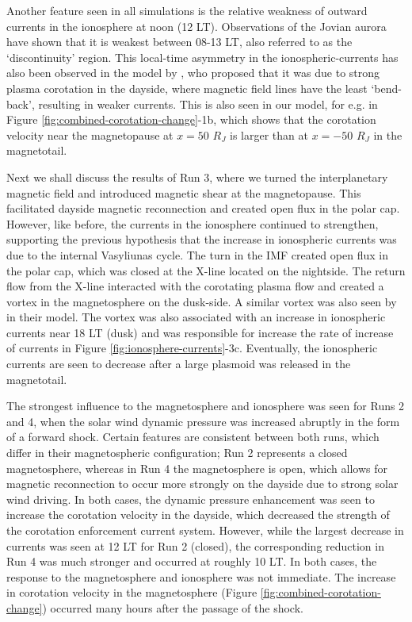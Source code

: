 Another feature seen in all simulations is the relative weakness of outward currents in the ionosphere at noon (12 LT). Observations of the Jovian aurora have shown that it is weakest between 08-13 LT, also referred to as the `discontinuity' region. This local-time asymmetry in the ionospheric-currents has also been observed in the model by , who proposed that it was due to strong plasma corotation in the dayside, where magnetic field lines have the least `bend-back', resulting in weaker currents. This is also seen in our model, for e.g. in Figure \ref{fig:combined-corotation-change}-1b, which shows that the corotation velocity near the magnetopause at $x=50$ $R_J$ is larger than at $x=-50$ $R_J$ in the magnetotail. 

Next we shall discuss the results of Run 3, where we turned the interplanetary magnetic field and introduced magnetic shear at the magnetopause. This facilitated dayside magnetic reconnection and created open flux in the polar cap. However, like before, the currents in the ionosphere continued to strengthen, supporting the previous hypothesis that the increase in ionospheric currents was due to the internal Vasyliunas cycle. The turn in the IMF created open flux in the polar cap, which was closed at the X-line located on the nightside. The return flow from the X-line interacted with the corotating plasma flow and created a vortex in the magnetosphere on the dusk-side. A similar vortex was also seen by \cite{Fukazawa2006a} in their model. The vortex was also associated with an increase in ionospheric currents near 18 LT (dusk) and was responsible for increase the rate of increase of currents in Figure \ref{fig:ionosphere-currents}-3c. Eventually, the ionospheric currents are seen to decrease after a large plasmoid was released in the magnetotail.

The strongest influence to the magnetosphere and ionosphere was seen for Runs 2 and 4, when the solar wind dynamic pressure was increased abruptly in the form of a forward shock. Certain features are consistent between both runs, which differ in their magnetospheric configuration; Run 2 represents a closed magnetosphere, whereas in Run 4 the magnetosphere is open, which allows for magnetic reconnection to occur more strongly on the dayside due to strong solar wind driving. In both cases, the dynamic pressure enhancement was seen to increase the corotation velocity in the dayside, which decreased the strength of the corotation enforcement current system. However, while the largest decrease in currents was seen at 12 LT for Run 2 (closed), the corresponding reduction in Run 4 was much stronger and occurred at roughly 10 LT. In both cases, the response to the magnetosphere and ionosphere was not immediate. The increase in corotation velocity in the magnetosphere (Figure \ref{fig:combined-corotation-change}) occurred many hours after the passage of the shock. 

